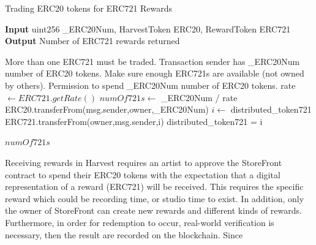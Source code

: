 \documentclass[12pt,tightenlines,letterpaper]{scrartcl}
\begin{document}
 
 \begin{algorithm}[ht]
   \caption{Trading ERC20 tokens for ERC721 Rewards}\label{alg:tradingTokens}
   \hspace*{\algorithmicindent} \textbf{Input} uint256 \_ERC20Num, HarvestToken ERC20, RewardToken ERC721 \\
   \hspace*{\algorithmicindent} \textbf{Output} Number of ERC721 rewards returned
   \begin{algorithmic}[1]
     \Require
       \Statex More than one ERC721 must be traded.
       \Statex Transaction sender has \_ERC20Num number of ERC20 tokens.
       \Statex Make sure enough ERC721s are available (not owned by others).
       \Statex Permission to spend \_ERC20Num number of ERC20 tokens.
     \Statex
     \State rate$ \gets ERC721.getRate()$ 
     \State  $ numOf721s \gets $ \_ERC20Num / rate
     \State ERC20.transferFrom(msg.sender,owner,\_ERC20Num) 
     \State $ i \gets $ distributed\_token721 	
     \Repeat
	     \State ERC721.transferFrom(owner,msg.sender,i)
     \State distributed\_token721 = i
     
     \Return $numOf721s$
   
   \end{algorithmic}
 \end{algorithm}
 
 Receiving rewards in Harvest requires an artist to approve the StoreFront contract to spend their ERC20 tokens with the expectation that a digital representation of a reward (ERC721) will be received. This requires the specific reward which could be recording time, or studio time to exist. In addition, only the owner of StoreFront can create new rewards and different kinds of rewards. Furthermore, in order for redemption to occur, real-world verification is necessary, then the result are recorded on the \gls{blockchain}. Since
   
 
\end{document}

